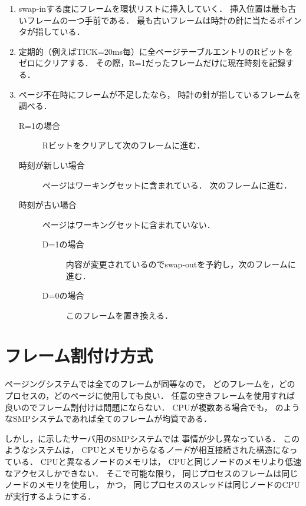 \begin{enumerate}
\item swap-inする度にフレームを環状リストに挿入していく．
  挿入位置は最も古いフレームの一つ手前である．
  最も古いフレームは時計の針に当たるポインタが指している．
\item 定期的（例えばTICK=20ms毎）に全ページテーブルエントリのRビットを
  ゼロにクリアする．
  その際，R=1だったフレームだけに現在時刻を記録する．
\item ページ不在時にフレームが不足したなら，
  時計の針が指しているフレームを調べる．
  \begin{description}
  \item[R=1の場合]
    Rビットをクリアして次のフレームに進む．
  \item[時刻が新しい場合]
    ページはワーキングセットに含まれている．
    次のフレームに進む．
  \item[時刻が古い場合]
    ページはワーキングセットに含まれていない．
    \begin{description}
      \item[D=1の場合]
        内容が変更されているのでswap-outを予約し，次のフレームに進む．
      \item[D=0の場合]
        このフレームを置き換える．
    \end{description}
  \end{description}
\end{enumerate}

\section{フレーム割付け方式}\label{frameAllocation}
ページングシステムでは全てのフレームが同等なので，
どのフレームを，どのプロセスの，どのページに使用しても良い．
任意の空きフレームを使用すれば良いのでフレーム割付けは問題にならない．
CPUが複数ある場合でも，
のようなSMPシステムであれば全てのフレームが均質である．

しかし，に示したサーバ用のSMPシステムでは
事情が少し異なっている．
このようなシステムは，
CPUとメモリからなる\emph{ノード}が相互接続された構造になっている．
CPUと異なるノードのメモリは，
CPUと同じノードのメモリより低速なアクセスしかできない．
そこで可能な限り，
同じプロセスのフレームは同じノードのメモリを使用し，
かつ，
同じプロセスのスレッドは同じノードのCPUが実行するようにする．

